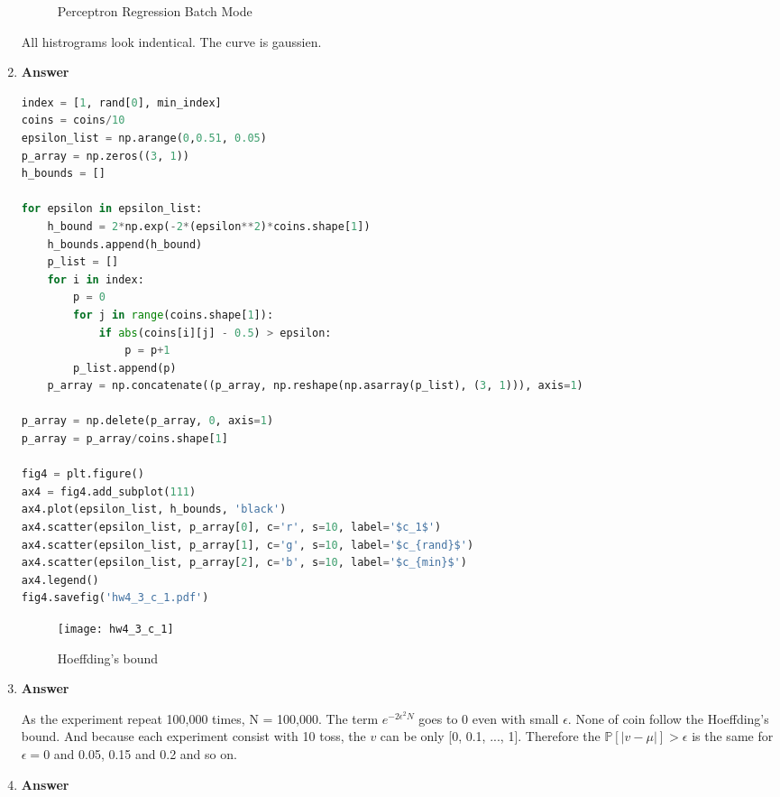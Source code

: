 \documentclass[11pt]{article}
\begin{document}
\begin{enumerate}[label=(\alph*)]
\begin{figure}[H]
\caption{Perceptron  Regression Batch Mode}
\label{fig:hw4_2_b_2}
\end{figure}

All histrograms look indentical. The curve is gaussien. 


\item  \textbf{Answer}

\begin{lstlisting}[language=Python, showstringspaces=false]
index = [1, rand[0], min_index]
coins = coins/10
epsilon_list = np.arange(0,0.51, 0.05)
p_array = np.zeros((3, 1))
h_bounds = []

for epsilon in epsilon_list:
    h_bound = 2*np.exp(-2*(epsilon**2)*coins.shape[1])
    h_bounds.append(h_bound)
    p_list = []
    for i in index:
        p = 0
        for j in range(coins.shape[1]):
            if abs(coins[i][j] - 0.5) > epsilon:
                p = p+1
        p_list.append(p)
    p_array = np.concatenate((p_array, np.reshape(np.asarray(p_list), (3, 1))), axis=1)
    
p_array = np.delete(p_array, 0, axis=1)
p_array = p_array/coins.shape[1]

fig4 = plt.figure()
ax4 = fig4.add_subplot(111)
ax4.plot(epsilon_list, h_bounds, 'black')
ax4.scatter(epsilon_list, p_array[0], c='r', s=10, label='$c_1$')
ax4.scatter(epsilon_list, p_array[1], c='g', s=10, label='$c_{rand}$')
ax4.scatter(epsilon_list, p_array[2], c='b', s=10, label='$c_{min}$')
ax4.legend()
fig4.savefig('hw4_3_c_1.pdf')
\end{lstlisting}

\begin{figure}[H]
\centering
\texttt{[image: hw4\_3\_c\_1]}
\caption{Hoeffding's bound}
\label{fig:hw4_3_c_1}
\end{figure}


\item  \textbf{Answer}

As the experiment repeat 100,000 times, N = 100,000. The term $e^{-2\epsilon^2N}$ goes to 0 even with small $\epsilon$.
None of coin follow the Hoeffding’s bound. And because each experiment consist with 10 toss, the $v$ can be only [0, 0.1, ..., 1]. Therefore the $\mathbb{P}[|v-\mu|] > \epsilon$ is the same for $\epsilon = 0$ and 0.05, 0.15 and 0.2 and so on.


\item  \textbf{Answer}

\end{enumerate}
\end{document}
